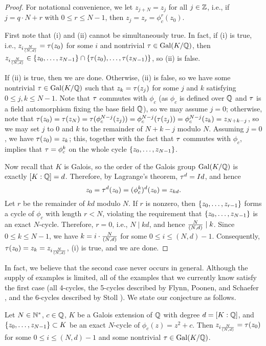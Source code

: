 \begin{proof}
  For notational convenience, we let $z_{j+N} = z_j$ for all $j \in
  \mathbb{Z}$, i.e., if $j = q \cdot N + r$ with $0 \le r \le N-1$, then $z_j
  = z_r = \phi_c^r(z_0)$.

  First note that (i) and (ii) cannot be simultaneously true. In fact,
  if (i) is true, i.e., $z_{i\frac{N}{(N, d)}} = \tau(z_0)$ for some $i$ and
  nontrivial $\tau \in \mathrm{Gal}(K/\mathbb{Q})$, then $z_{i\frac{N}{(N, d)}} \in \left\{z_0, \dots,
    z_{N-1}\right\} \cap \left\{\tau(z_0), \dots, \tau(z_{N-1})\right\}$, so (ii) is
  false.

  If (ii) is true, then we are done. Otherwise, (ii) is false, so we
  have some nontrivial $\tau \in \mathrm{Gal}(K/\mathbb{Q})$ such that $z_k = \tau(z_j)$
  for some $j$ and $k$ satisfying $0 \le j, k \le N-1$. Note that $\tau$
  commutes with $\phi_c$ (as $\phi_c$ is defined over $\mathbb{Q}$ and $\tau$ is
  a field automorphism fixing the base field $\mathbb{Q}$), so we may assume
  $j = 0$; otherwise, note that $\tau(z_0) = \tau(z_N) =
  \tau(\phi_c^{N-j}(z_j)) = \phi_c^{N-j}(\tau(z_j)) = \phi_c^{N-j}(z_k) =
  z_{N+k-j}$, so we may set $j$ to 0 and $k$ to the remainder of
  $N+k-j$ modulo $N$. Assuming $j = 0$, we have $\tau(z_0) = z_k$; this,
  together with the fact that $\tau$ commutes with $\phi_c$, implies
  that $\tau = \phi_c^k$ on the whole cycle $\left\{z_0, \dots, z_{N-1}\right\}$.

  Now recall that $K$ is Galois, so the order of the Galois group
  $\mathrm{Gal}(K/\mathbb{Q})$ is exactly $[K : \mathbb{Q}] = d$. Therefore, by Lagrange's
  theorem, $\tau^d = Id$, and hence
  \[
  z_0 = \tau^d(z_0) = (\phi_c^k)^d(z_0) = z_{kd}.
  \]
  Let $r$ be the remainder of $kd$ modulo $N$. If $r$ is nonzero, then
  $\left\{z_0, \dots, z_{r-1}\right\}$ forms a cycle of $\phi_c$ with length $r
  < N$, violating the requirement that $\left\{z_0, \dots, z_{N-1}\right\}$ is
  an exact $N$-cycle. Therefore, $r = 0$, i.e., $N \mid kd$, and hence
  $\frac{N}{(N, d)} \mid k$. Since $0 \le k \le N - 1$, we have $k = i \cdot \frac{N}{(N, d)}$
  for some $0 \le i \le (N, d) - 1$. Consequently, $\tau(z_0) = z_k =
  z_{i\frac{N}{(N, d)}}$, (i) is true, and we are done.
\end{proof}

In fact, we believe that the second case never occurs in
general. Although the supply of examples is limited, all of the
examples that we currently know satisfy the first case (all 4-cycles,
the 5-cycles described by Flynn, Poonen, and Schaefer
\cite{MR1480542}, and the 6-cycles described by Stoll
\cite{MR2465796}). We state our conjecture as follows.

\begin{conjecture}
  \label{cj:galois-conjugate}
  Let $N \in \mathbb{N}^*$, $c \in \mathbb{Q}$, $K$ be a Galois extension of $\mathbb{Q}$ with
  degree $d = [K : \mathbb{Q}]$, and $\left\{z_0, \dots, z_{N-1}\right\} \subset K$ be
  an exact $N$-cycle of $\phi_c(z) = z^2 + c$. Then $z_{i\frac{N}{(N, d)}} =
  \tau(z_0)$ for some $0 \le i \le (N, d)-1$ and some nontrivial $\tau \in
  \mathrm{Gal}(K/\mathbb{Q})$.
\end{conjecture}

